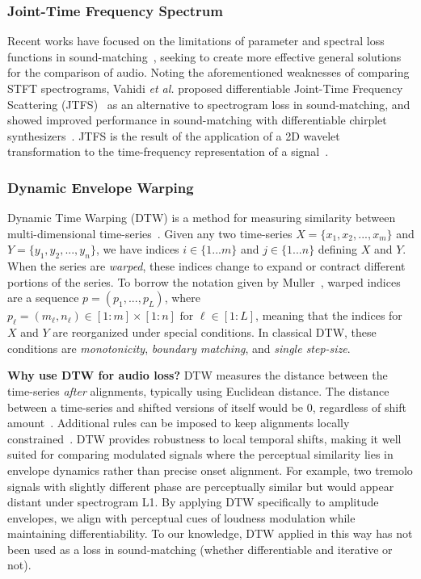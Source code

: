 \subsubsection{Joint-Time Frequency Spectrum}
Recent works have focused on the limitations of parameter and spectral loss functions in sound-matching~\cite{vahidi2023mesostructures,uzrad2024diffmoog}, seeking to create more effective general solutions for the comparison of audio. 
Noting the aforementioned weaknesses of comparing STFT spectrograms, Vahidi \textit{et al.} proposed differentiable Joint-Time Frequency Scattering (\gls{JTFS})~\cite{anden2015joint} as an alternative to spectrogram loss in sound-matching, and showed improved performance in sound-matching with differentiable chirplet synthesizers~\cite{vahidi2023mesostructures}. JTFS is the result of the application of a 2D wavelet transformation to the time-frequency representation of a signal~\cite{anden2015joint}. 

\subsubsection{Dynamic Envelope Warping}
Dynamic Time Warping (DTW) is a method for measuring similarity between multi-dimensional time-series~\cite{rabiner1993fundamentals,muller2007dynamic,giorgino2009computing}. Given any two time-series $X = \{x_1,x_2,...,x_m\}$ and $Y = \{y_1,y_2,...,y_n\}$, we have indices $i\in\{1...m\}$ and $j\in\{1...n\}$ defining $X$ and $Y$. When the series are \textit{warped}, these indices change to expand or contract different portions of the series. To borrow the notation given by Muller~\cite{muller2007dynamic}, warped indices are a sequence $p=(p_1,...,p_L)$, where \(p_\ell = (m_\ell, n_\ell) \in [1 : m] \times [1 : n] \text{ for } \ell \in [1 : L]\), meaning that the indices for $X$ and $Y$ are reorganized under special conditions. In classical DTW, these conditions are \textit{monotonicity}, \textit{boundary matching}, and \textit{single step-size}.



\textbf{Why use DTW for audio loss?}
DTW measures the distance between the time-series \textit{after} alignments, typically using Euclidean distance. The distance between a time-series and shifted versions of itself would be 0, regardless of shift amount~\cite{tavenard.blog.dtw}. Additional rules can be imposed to keep alignments locally constrained~\cite{itakura1975minimum,sakoe1978dynamic}. DTW provides robustness to local temporal shifts, making it well suited for comparing modulated signals where the perceptual similarity lies in envelope dynamics rather than precise onset alignment. 
For example, two tremolo signals with slightly different phase are perceptually similar but would appear distant under spectrogram L1. 
By applying DTW specifically to amplitude envelopes, we align with perceptual cues of loudness modulation while maintaining differentiability. 
To our knowledge, DTW applied in this way has not been used as a loss in sound-matching (whether differentiable and iterative or not).




